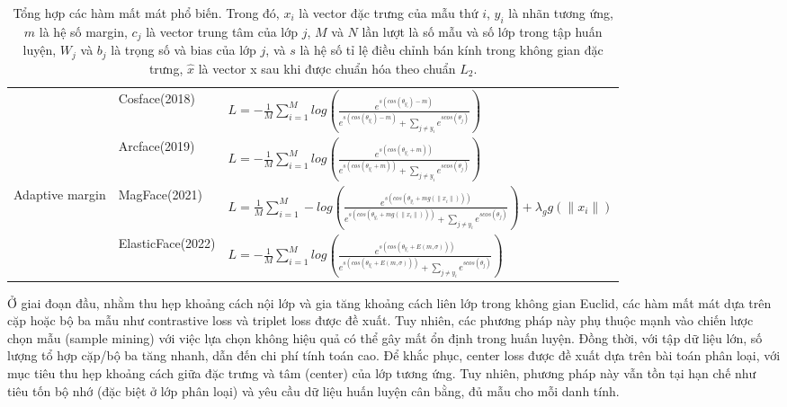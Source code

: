 \begin{table}[]
\begin{tabular}{|p{2cm}|l|p{9cm}|}
        & Cosface(2018)\cite{6_Wang_2018_CVPR} & $L= -\frac{1}{M}\sum_{i=1}^Mlog(\frac{e^{s(cos(\theta_{y_i}) - m)}}{e^{ s(cos(\theta_{y_i}) -m)}+\sum_{j\ne y_i}e^{ s cos(\theta_{j})}})$\\
        & Arcface(2019)\cite{4_Deng_2019_CVPR} & $L= -\frac{1}{M}\sum_{i=1}^Mlog(\frac{e^{s(cos(\theta_{y_i}+m))}}{e^{ s(cos(\theta_{y_i}+m))}+\sum_{j\ne y_i}e^{ s cos(\theta_{j})}})$\\              
        \hline
        \multirow[c]{2}{2cm}{Adaptive margin}& MagFace(2021)\cite{23_meng_2021_magface} & $L= \frac{1}{M}\sum_{i=1}^M-log(\frac{e^{s(cos(\theta_{y_i}+mg(\lVert x_i \rVert)))}}{e^{ s(cos(\theta_{y_i}+mg(\lVert x_i \rVert)))}+\sum_{j\ne y_i}e^{ s cos(\theta_{j})}})+ \lambda_gg(\lVert x_i \rVert)$
        \\ &ElasticFace(2022)\cite{5_Boutros_2022_CVPR}  & $L= -\frac{1}{M}\sum_{i=1}^Mlog(\frac{e^{s(cos(\theta_{y_i}+E(m,\sigma)))}}{e^{ s(cos(\theta_{y_i}+E(m,\sigma)))}+\sum_{j\ne y_i}e^{ s cos(\theta_{j})}})$\\
        \hline
    \end{tabular}
    \caption[Tổng hợp các hàm mất mát phổ biến]{ Tổng hợp các hàm mất mát phổ biến. Trong đó, $x_i$ là vector đặc trưng của mẫu thứ $i$, $y_i$ là nhãn tương ứng, $m$ là hệ số margin, $c_j$ là vector trung tâm của lớp $j$, $M$ và $N$ lần lượt là số mẫu và số lớp trong tập huấn luyện, $W_j$ và $b_j$ là trọng số và bias của lớp $j$, và $s$ là hệ số tỉ lệ điều chỉnh bán kính trong không gian đặc trưng, $\hat{x}$ là vector x sau khi được chuẩn hóa theo chuẩn $L_2$. 
    }
    \label{tab:loss_table}
\end{table}

Ở giai đoạn đầu, nhằm thu hẹp khoảng cách nội lớp và gia tăng khoảng cách liên lớp trong không gian Euclid, các hàm mất mát dựa trên cặp hoặc bộ ba mẫu như contrastive loss và triplet loss\cite{39_Schroff_2015_CVPR} được đề xuất. Tuy nhiên, các phương pháp này phụ thuộc mạnh vào chiến lược chọn mẫu (sample mining) với việc lựa chọn không hiệu quả có thể gây mất ổn định trong huấn luyện. Đồng thời, với tập dữ liệu lớn, số lượng tổ hợp cặp/bộ ba tăng nhanh, dẫn đến chi phí tính toán cao. Để khắc phục, center loss\cite{LOSS_Center_10.1007/978-3-319-46478-7_31} được đề xuất dựa trên bài toán phân loại, với mục tiêu thu hẹp khoảng cách giữa đặc trưng và tâm (center) của lớp tương ứng. Tuy nhiên, phương pháp này vẫn tồn tại hạn chế như tiêu tốn bộ nhớ (đặc biệt ở lớp phân loại) và yêu cầu dữ liệu huấn luyện cân bằng, đủ mẫu cho mỗi danh tính.

